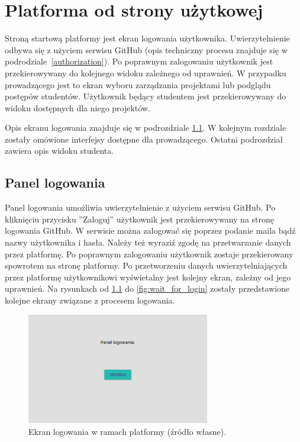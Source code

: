 \chapter{Platforma od strony użytkowej}
\label{chapter:interfaces}

Stroną startową platformy jest ekran logowania użytkownika.
Uwierzytelnienie odbywa się z użyciem serwisu GitHub (opis techniczny procesu znajduje się w podrodziale~\ref{authorization}).
Po poprawnym zalogowaniu użytkownik jest przekierowywany do kolejnego widoku zależnego od uprawnień.
W przypadku prowadzącego jest to ekran wyboru zarządzania projektami lub podglądu postępów studentów.
Użytkownik będący studentem jest przekierowywany do widoku dostępnych dla niego projektów.

Opis ekranu logowania znajduje się w podrozdziale \ref{fe_login}.
W kolejnym rozdziale zostały omówione interfejsy dostępne dla prowadzącego.
Ostatni podrozdział zawiera opis widoku studenta.

\section{Panel logowania}
\label{fe_login}

Panel logowania umożliwia uwierzytelnienie z użyciem serwisu GitHub.
Po kliknięciu przycisku ”Zaloguj” użytkownik jest przekierowywany na stronę logowania GitHub.
W serwisie można zalogować się poprzez podanie maila bądź nazwy użytkownika i hasła.
Należy też wyraziź zgodę na przetwarzanie danych przez platformę.
Po poprawnym zalogowaniu użytkownik zostaje przekierowany spowrotem na stronę platformy.
Po przetworzeniu danych uwierzytelniających przez platformę użytkownikowi wyświetalny jest kolejny ekran, zależny od jego uprawnień.
Na rysunkach od \ref{fig:log_in_butoon} do \ref{fig:wait_for_login} zostały przedstawione kolejne ekrany związane z procesem logowania.

\vfill

\begin{figure}[h]
    \centering
    \includegraphics[width = 8cm]{chapter04/log_in_button.png}
    \caption{Ekran logowania w ramach platformy (źródło własne).}
    \label{fig:log_in_butoon}
\end{figure}

